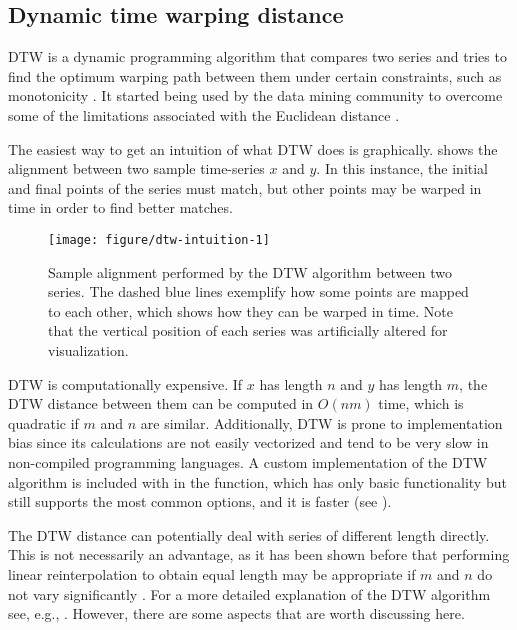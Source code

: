 \subsection{Dynamic time warping distance}
\label{sec:dtw}

DTW is a dynamic programming algorithm that compares two series and tries to find the optimum warping path between them under certain constraints,
such as monotonicity \citep{berndt1994}.
It started being used by the data mining community to overcome some of the limitations associated with the Euclidean distance \citep{keogh2004}.

The easiest way to get an intuition of what DTW does is graphically.
 shows the alignment between two sample time-series $x$ and $y$.
In this instance, the initial and final points of the series must match,
but other points may be warped in time in order to find better matches.

\begin{figure}[htbp]

{\centering \texttt{[image: figure/dtw-intuition-1]}

}

\caption{Sample alignment performed by the DTW algorithm between two series. The dashed blue lines exemplify how some points are mapped to each other, which shows how they can be warped in time. Note that the vertical position of each series was artificially altered for visualization.}\label{fig:dtw-intuition}
\end{figure}

DTW is computationally expensive.
If $x$ has length $n$ and $y$ has length $m$,
the DTW distance between them can be computed in $O(nm)$ time,
which is quadratic if $m$ and $n$ are similar.
Additionally, DTW is prone to implementation bias since its calculations are not easily vectorized and tend to be very slow in non-compiled programming languages.
A custom implementation of the DTW algorithm is included with \dtwclust{} in the  function,
which has only basic functionality but still supports the most common options,
and it is faster (see ).

The DTW distance can potentially deal with series of different length directly.
This is not necessarily an advantage,
as it has been shown before that performing linear reinterpolation to obtain equal length may be appropriate if $m$ and $n$ do not vary significantly \citep{keogh2004}.
For a more detailed explanation of the DTW algorithm see, e.g., \citet{giorgino2009}.
However, there are some aspects that are worth discussing here.

